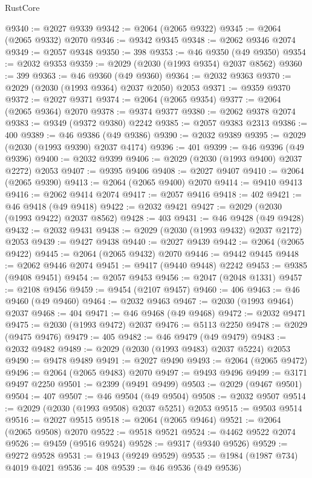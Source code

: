 \begin{lexlean}{RustCore}
\begin{coremodule}
@9340 := @2027 @9339
@9342 := @2064 (@2065 @9322)
@9345 := @2064 (@2065 @9332) @2070
@9346 := @9342 @9345
@9348 := @2062 @9346 @2074
@9349 := @2057 @9348
@9350 := 398
@9353 := @46 @9350 (@49 @9350)
@9354 := @2032 @9353
@9359 := @2029 (@2030 (@1993 @9354) @2037 @8562)
@9360 := 399
@9363 := @46 @9360 (@49 @9360)
@9364 := @2032 @9363
@9370 := @2029 (@2030 (@1993 @9364) @2037 @2050) @2053
@9371 := @9359 @9370
@9372 := @2027 @9371
@9374 := @2064 (@2065 @9354)
@9377 := @2064 (@2065 @9364) @2070
@9378 := @9374 @9377
@9380 := @2062 @9378 @2074
@9383 := @9349 (@9372 @9380) @2242
@9385 := @2057 @9383 @2313
@9386 := 400
@9389 := @46 @9386 (@49 @9386)
@9390 := @2032 @9389
@9395 := @2029 (@2030 (@1993 @9390) @2037 @4174)
@9396 := 401
@9399 := @46 @9396 (@49 @9396)
@9400 := @2032 @9399
@9406 := @2029 (@2030 (@1993 @9400) @2037 @2272) @2053
@9407 := @9395 @9406
@9408 := @2027 @9407
@9410 := @2064 (@2065 @9390)
@9413 := @2064 (@2065 @9400) @2070
@9414 := @9410 @9413
@9416 := @2062 @9414 @2074
@9417 := @2057 @9416
@9418 := 402
@9421 := @46 @9418 (@49 @9418)
@9422 := @2032 @9421
@9427 := @2029 (@2030 (@1993 @9422) @2037 @8562)
@9428 := 403
@9431 := @46 @9428 (@49 @9428)
@9432 := @2032 @9431
@9438 := @2029 (@2030 (@1993 @9432) @2037 @2172) @2053
@9439 := @9427 @9438
@9440 := @2027 @9439
@9442 := @2064 (@2065 @9422)
@9445 := @2064 (@2065 @9432) @2070
@9446 := @9442 @9445
@9448 := @2062 @9446 @2074
@9451 := @9417 (@9440 @9448) @2242
@9453 := @9385 (@9408 @9451)
@9454 := @2057 @9453
@9456 := @2047 (@2048 @1331)
@9457 := @2108 @9456
@9459 := @9454 (@2107 @9457)
@9460 := 406
@9463 := @46 @9460 (@49 @9460)
@9464 := @2032 @9463
@9467 := @2030 (@1993 @9464) @2037
@9468 := 404
@9471 := @46 @9468 (@49 @9468)
@9472 := @2032 @9471
@9475 := @2030 (@1993 @9472) @2037
@9476 := @5113 @2250
@9478 := @2029 (@9475 @9476)
@9479 := 405
@9482 := @46 @9479 (@49 @9479)
@9483 := @2032 @9482
@9489 := @2029 (@2030 (@1993 @9483) @2037 @5224) @2053
@9490 := @9478 @9489
@9491 := @2027 @9490
@9493 := @2064 (@2065 @9472)
@9496 := @2064 (@2065 @9483) @2070
@9497 := @9493 @9496
@9499 := @3171 @9497 @2250
@9501 := @2399 (@9491 @9499)
@9503 := @2029 (@9467 @9501)
@9504 := 407
@9507 := @46 @9504 (@49 @9504)
@9508 := @2032 @9507
@9514 := @2029 (@2030 (@1993 @9508) @2037 @5251) @2053
@9515 := @9503 @9514
@9516 := @2027 @9515
@9518 := @2064 (@2065 @9464)
@9521 := @2064 (@2065 @9508) @2070
@9522 := @9518 @9521
@9524 := @4462 @9522 @2074
@9526 := @9459 (@9516 @9524)
@9528 := @9317 (@9340 @9526)
@9529 := @9272 @9528
@9531 := @1943 (@9249 @9529)
@9535 := @1984 (@1987 @734) @4019 @4021
@9536 := 408
@9539 := @46 @9536 (@49 @9536)

\end{coremodule}
\end{lexlean}
